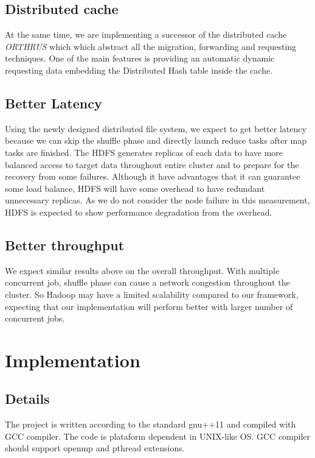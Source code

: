 \documentclass[nocopyrightspace]{sigplanconf}
\begin{document}
\subsection*{Distributed cache}
At the same time, we are implementing a successor of the distributed cache \textit{ORTHRUS} which
which abstract all the migration, forwarding and requesting techniques. One of the main features
is providing an automatic dynamic requesting data embedding the Distributed Hash table inside the
cache.

\subsection*{Better Latency}
Using the newly designed distributed file system, we expect to get better latency because we
can skip the shuffle phase and directly launch reduce tasks after map tasks are finished. The
HDFS generates replicas of each data to have more balanced access to target data throughout
entire cluster and to prepare for the recovery from some failures. Although it have advantages
that it can guarantee some load balance, HDFS will have some overhead to have redundant unnecessary
replicas. As we do not consider the node failure in this measurement, HDFS is expected to show
performance degradation from the overhead.

\subsection*{Better throughput}
We expect similar results above on the overall throughput. With multiple concurrent job, shuffle
phase can cause a network congestion throughout the cluster. So Hadoop may have a limited scalability
compared to our framework, expecting that our implementation will perform better with larger
number of concurrent jobs.


\section*{Implementation}
\subsection*{Details}
The project is written according to the standard gnu++11 and compiled with GCC compiler.
The code is plataform dependent in UNIX-like OS. GCC compiler should support openmp and
pthread extensions. \\\\
\end{document}
